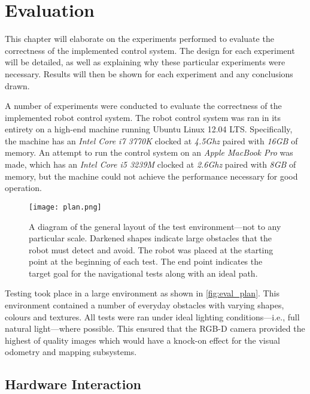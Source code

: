 \chapter{Evaluation}
\label{chap:evaluation}


This chapter will elaborate on the experiments performed to evaluate the correctness of the implemented control system. The design for each experiment will be detailed, as well as explaining why these particular experiments were necessary. Results will then be shown for each experiment and any conclusions drawn.

A number of experiments were conducted to evaluate the correctness of the implemented robot control system. The robot control system was ran in its entirety on a high-end machine running Ubuntu Linux 12.04 LTS. Specifically, the machine has an \emph{Intel Core i7 3770K} clocked at \emph{4.5Ghz} paired with \emph{16GB} of memory. An attempt to run the control system on an \emph{Apple MacBook Pro} was made, which has an \emph{Intel Core i5 3239M} clocked at \emph{2.6Ghz} paired with \emph{8GB} of memory, but the machine could not achieve the performance necessary for good operation.

\begin{figure}[!h]
	\centering
	\texttt{[image: plan.png]}
	\caption{A diagram of the general layout of the test environment---not to any particular scale. Darkened shapes indicate large obstacles that the robot must detect and avoid. The robot was placed at the starting point at the beginning of each test. The end point indicates the target goal for the navigational tests along with an ideal path.}
	\label{fig:eval_plan}
\end{figure}

Testing took place in a large environment as shown in \autoref{fig:eval_plan}. This environment contained a number of everyday obstacles with varying shapes, colours and textures. All tests were ran under ideal lighting conditions---i.e., full natural light---where possible. This ensured that the RGB-D camera provided the highest of quality images which would have a knock-on effect for the visual odometry and mapping subsystems.

\section{Hardware Interaction}

